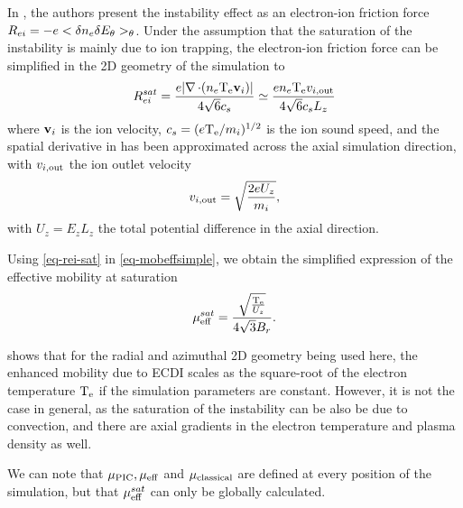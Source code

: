   In  \citet{lafleur2016a}, the authors present the instability effect as an electron-ion friction force $R_{ei} = - e < \delta n_e \delta E_{\theta} >_{\theta}$.
  Under the assumption that the saturation of the instability is mainly due to ion trapping, the electron-ion friction force can be simplified in the \ac{2D} geometry of the simulation to
  \begin{equation} \label{eq-rei-sat}
    R_{ei}^{sat} = \frac{e \lvert\operatorname{{\mathbf \nabla}} \cdot (n_e \mathrm{T_e} {\mathbf v_i})\rvert}{4 \sqrt{6} c_s} \simeq \frac{e n_e \mathrm{T_e}  v_{i, \rm out} }{4 \sqrt 6 c_s L_z}
  \end{equation} 
  where ${\mathbf v_i}$ is the ion velocity, $c_s=(e \mathrm{T_e}/m_i)^{1/2}$  is the ion sound speed, and the spatial derivative in has been approximated across the axial simulation direction, with $ v_{i, \rm out} $ the ion outlet velocity 
  \begin{equation} \label{eq-viz}
     v_{i, \rm out}  = \sqrt{\frac{2 e U_z}{m_i}},
  \end{equation}
  with $U_z = E_z L_z$ the total potential difference in the axial direction.
  
  Using \cref{eq-rei-sat} in \cref{eq-mobeffsimple}, we obtain the simplified expression of the effective mobility at saturation
  \begin{equation} \label{eq-mobeffsat}
    \mu_{\mathrm{eff}}^{sat} = \frac{\sqrt{\frac{\mathrm{T_e}}{U_z}}}{4\sqrt{3}B_r}.
  \end{equation}
  
   shows that for the radial and azimuthal \ac{2D} geometry being used here, the enhanced mobility due to \ac{ECDI} scales as the square-root of the electron temperature $\mathrm{T_e}$ if the simulation parameters are constant.
  However, it is not the case in general, as the saturation of the instability can be also be due to convection, and there are axial gradients in the electron temperature and plasma density as well.
  
  We can note that $\mu_{\mathrm{PIC}}, \mu_{\mathrm{eff}}$ and $\mu_{\mathrm{classical}}$ are defined at every position of the simulation, but that $\mu_{\mathrm{eff}}^{sat}$ can only be globally calculated. 
  
  
  
  
  